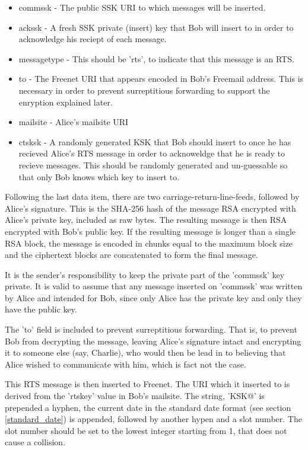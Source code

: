 \documentclass[12pt,a4paper]{article}
\begin{document}
\begin{itemize}
\item commssk - The public SSK URI to which messages will be inserted.
\item ackssk - A fresh SSK private (insert) key that Bob will insert to in order to acknowledge his reciept of each message.
\item messagetype - This should be 'rts', to indicate that this message is an RTS.
\item to - The Freenet URI that appears encoded in Bob's Freemail address. This is necessary in order to prevent surreptitious forwarding to support the enryption explained later.
\item mailsite - Alice's mailsite URI
\item ctsksk - A randomly generated KSK that Bob should insert to once he has recieved Alice's RTS message in order to acknoweldge that he is ready to recieve messages. This should be randomly generated and un-guessable so that only Bob knows which key to insert to.
\end{itemize}

Following the last data item, there are two carriage-return-line-feeds, followed by Alice's signature. This is the SHA-256 hash of the message RSA encrypted with Alice's private key, included as raw bytes. The resulting message is then RSA encrypted with Bob's public key. If the resulting message is longer than a single RSA block, the message is encoded in chunks equal to the maximum block size and the ciphertext blocks are concatenated to form the final message.

It is the sender's responsibility to keep the private part of the 'commssk' key private. It is valid to assume that any message inserted on 'commssk' was written by Alice and intended for Bob, since only Alice has the private key and only they have the public key.

The 'to' field is included to prevent surreptitious forwarding. That is, to prevent Bob from decrypting the message, leaving Alice's signature intact and encrypting it to someone else (say, Charlie), who would then be lead in to believing that Alice wished to communicate with him, which is fact not the case.

This RTS message is then inserted to Freenet. The URI which it inserted to is derived from the 'rtskey' value in Bob's mailsite. The string, 'KSK@' is prepended a hyphen, the current date in the standard date format (see section \ref{standard_date}) is appended, followed by another hypen and a slot number. The slot number should be set to the lowest integer starting from 1, that does not cause a collision.
\end{document}
